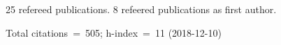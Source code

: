 25 refereed publications. 8 refeered publications as first author.

Total citations~=~505; h-index~=~11 (2018-12-10)